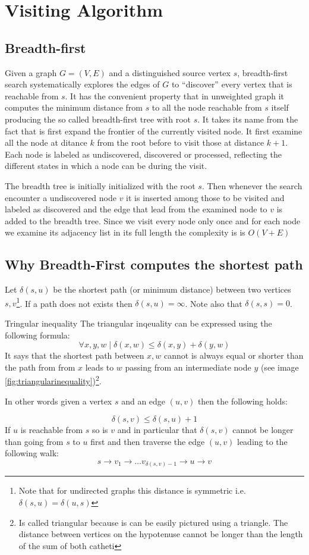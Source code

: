 \section{Visiting Algorithm}

\subsection{Breadth-first}

Given a graph $G = (V,E)$ and a distinguished source vertex $s$, breadth-first
search systematically explores the edges of $G$ to “discover” every vertex that is
reachable from $s$. It has the convenient property that in unweighted graph it computes the minimum distance from $s$ to all the node reachable from $s$ itself producing the so called breadth-first tree with root $s$. It takes its name from the fact that is first expand the frontier of the currently visited node. It first examine all the node at ditance $k$ from the root before to visit those at distance $k+1$.
Each node is labeled as undiscovered, discovered or processed, reflecting the different states in which a node can be during the visit.

The breadth tree is initially initialized with the root $s$. Then whenever the search encounter a undiscovered node $v$ it is inserted among those to be visited and labeled as discovered and the edge that lead from the examined node to $v$ is added to the breadth tree. Since we visit every node only once and for each node we examine its adjacency list in its full length the complexity is is $O(V+E)$


\subsection{Why Breadth-First computes the shortest path}
Let $\delta(s,u)$ be the shortest path (or minimum distance) between two vertices $s,v$\footnote{Note that for undirected graphs this distance is symmetric i.e. $\delta(s,u) = \delta(u,s)$}. If a path does not exists then $\delta(s,u) = \infty$. Note also that $\delta(s,s) = 0$. 
\begin{theorem}{Tringular inequality}
\label{theo:triangular_inequality}
The triangular inqeuality can be expressed using the following formula:
\[
\forall x,y,w \; |\; \delta(x,w) \leq   \delta(x,y) + \delta(y,w)
\]
It says that the shortest path between $x,w$ cannot is always equal or shorter than the path from from $x$ leads to $w$ passing from an intermediate node $y$ (see image \ref{fig:triangularinequality})\footnote{Is called triangular because is can be easily pictured using a triangle. The distance between vertices on the hypotenuse cannot be longer than the length  of the sum of both catheti}.

In other words given a vertex $s$ and an edge $(u,v)$ then the following holds:

\[
\delta(s,v) \leq \delta(s,u) + 1
\]
If $u$ is reachable from $s$ so is $v$ and in particular that $\delta(s,v)$ cannot be longer than going from $s$ to $u$ first and then traverse the edge $(u,v)$ leading to the following walk: 
\[s \rightarrow v_1  \rightarrow  \ldots  v_{\delta(s,v)-1}  \rightarrow u  \rightarrow  v\]
\end{theorem}

